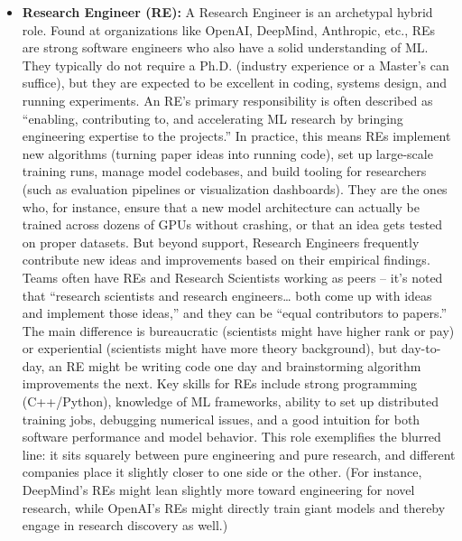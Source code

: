 \documentclass[pdflatex,sn-mathphys-num]{sn-jnl}%
\theoremstyle{thmstyleone}%
\theoremstyle{thmstyletwo}%
\theoremstyle{thmstylethree}%
\begin{document}
\begin{itemize}
\item \textbf{Research Engineer (RE):} A Research Engineer is an archetypal hybrid role. Found at organizations like OpenAI, DeepMind, Anthropic, etc., REs are strong software engineers who also have a solid understanding of ML. They typically do not require a Ph.D. (industry experience or a Master’s can suffice), but they are expected to be excellent in coding, systems design, and running experiments. An RE’s primary responsibility is often described as “enabling, contributing to, and accelerating ML research by bringing engineering expertise to the projects.” In practice, this means REs implement new algorithms (turning paper ideas into running code), set up large-scale training runs, manage model codebases, and build tooling for researchers (such as evaluation pipelines or visualization dashboards). They are the ones who, for instance, ensure that a new model architecture can actually be trained across dozens of GPUs without crashing, or that an idea gets tested on proper datasets. But beyond support, Research Engineers frequently contribute new ideas and improvements based on their empirical findings. Teams often have REs and Research Scientists working as peers – it’s noted that “research scientists and research engineers… both come up with ideas and implement those ideas,” and they can be “equal contributors to papers.”\cite{Huyen2022} The main difference is bureaucratic (scientists might have higher rank or pay) or experiential (scientists might have more theory background), but day-to-day, an RE might be writing code one day and brainstorming algorithm improvements the next. Key skills for REs include strong programming (C++/Python), knowledge of ML frameworks, ability to set up distributed training jobs, debugging numerical issues, and a good intuition for both software performance and model behavior. This role exemplifies the blurred line: it sits squarely between pure engineering and pure research, and different companies place it slightly closer to one side or the other. (For instance, DeepMind’s REs might lean slightly more toward engineering for novel research, while OpenAI’s REs might directly train giant models and thereby engage in research discovery as well.) 


\end{itemize}
\end{document}
